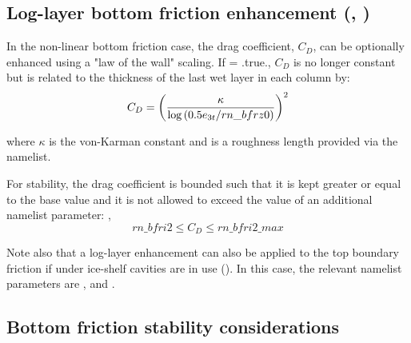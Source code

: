 \documentclass[../main/NEMO_manual]{subfiles}
\begin{document}
\subsection[Log-layer btm frict enhncmnt (\protect\np{nn\_botfr}\forcode{ = 2}, \protect\np{ln\_loglayer}\forcode{ = .true.})]
				{Log-layer bottom friction enhancement (\protect{}, \protect{})}
\label{subsec:ZDF_bfr_loglayer}

In the non-linear bottom friction case, the drag coefficient, $C_D$, can be optionally enhanced using
a "law of the wall" scaling.
If   = .true., $C_D$ is no longer constant but is related to the thickness of
the last wet layer in each column by:
\[
  C_D = \left ( {\kappa \over {\rm log}\left ( 0.5e_{3t}/rn\_bfrz0 \right ) } \right )^2
\]

\noindent where $\kappa$ is the von-Karman constant and  is a roughness length provided via
the namelist.

For stability, the drag coefficient is bounded such that it is kept greater or equal to
the base  value and it is not allowed to exceed the value of an additional namelist parameter:
, \ie
\[
  rn\_bfri2 \leq C_D \leq rn\_bfri2\_max
\]

\noindent Note also that a log-layer enhancement can also be applied to the top boundary friction if
under ice-shelf cavities are in use ().
In this case, the relevant namelist parameters are ,  and .

\subsection{Bottom friction stability considerations}
\label{subsec:ZDF_bfr_stability}
\end{document}
